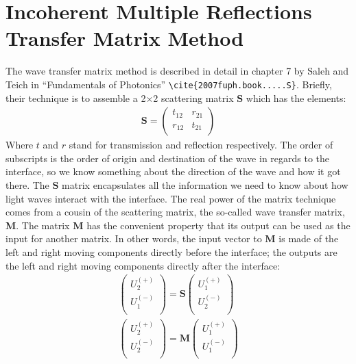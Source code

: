 \documentclass[osajnl,preprint,showpacs,superscriptaddress,12pt]{revtex4-1} %
\begin{document}
\section{Incoherent Multiple Reflections Transfer Matrix Method}
\label{sec:Append-IMRTMM}

The wave transfer matrix method is described in detail in chapter 7 by Saleh and Teich in ``Fundamentals of Photonics'' \verb|\cite{2007fuph.book.....S}|.  Briefly, their technique is to assemble a 2$\times$2 scattering matrix $\boldsymbol{S}$ which has the elements:
\begin{eqnarray}
\boldsymbol{S} = \left(
\begin{array}{cc}
 t_{12} & r_{21} \\
 r_{12} & t_{21} \\
\end{array}
\right)
\end{eqnarray}
Where $t$ and $r$ stand for transmission and reflection respectively.  The order of subscripts is the order of origin and destination of the wave in regards to the interface, so we know something about the direction of the wave and how it got there.  The $\boldsymbol{S}$ matrix encapsulates all the information we need to know about how light waves interact with the interface.  The real power of the matrix technique comes from a cousin of the scattering matrix, the so-called wave transfer matrix, $\boldsymbol{M}$.  The matrix $\boldsymbol{M}$ has the convenient property that its output can be used as the input for another matrix.  In other words, the input vector to $\boldsymbol{M}$ is made of the left and right moving components directly before the interface; the outputs are the left and right moving components directly after the interface:
\begin{eqnarray}
\left(
\begin{array}{c}
 U_2^{(+)} \\
 U_1^{(-)} \\
\end{array}
\right)=\boldsymbol{S} \left(
\begin{array}{c}
 U_1^{(+)} \\
 U_2^{(-)} \\
\end{array}
\right) \\
\left(
\begin{array}{c}
 U_2^{(+)} \\
 U_2^{(-)} \\
\end{array}
\right)=\boldsymbol{M} \left(
\begin{array}{c}
 U_1^{(+)} \\
 U_1^{(-)} \\
\end{array}
\right)
\end{eqnarray}
\end{document}
